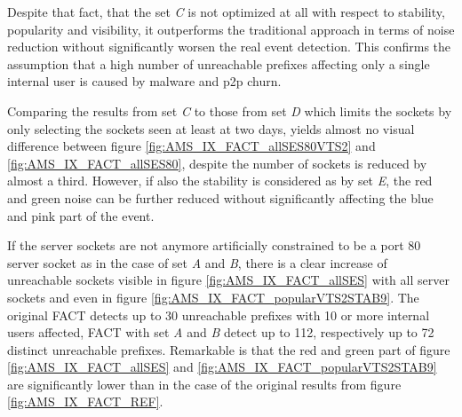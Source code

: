 Despite that fact, that the set \emph{C} is not optimized at all with respect to 
stability, popularity and visibility, it outperforms the traditional approach in 
terms of noise reduction without significantly worsen the real event detection. 
This confirms the assumption that a high number of unreachable prefixes 
affecting only a single internal user is caused by malware and \gls{p2p} churn.

Comparing the results from set \emph{C} to those from set \emph{D} which limits 
the sockets by only selecting the sockets seen at least at two days, yields 
almost no visual difference between figure \ref{fig:AMS_IX_FACT_allSES80VTS2} 
and \ref{fig:AMS_IX_FACT_allSES80}, despite the number of sockets is reduced by 
almost a third. However, if also the stability is considered as by set \emph{E}, 
the red and green noise can be further reduced without significantly affecting 
the blue and pink part of the event.

If the \glspl{server socket} are not anymore artificially constrained to be a 
port 80 \gls{server socket} as in the case of set \emph{A} and \emph{B}, there 
is a clear increase of unreachable sockets visible in figure 
\ref{fig:AMS_IX_FACT_allSES} with all server sockets and even in figure 
\ref{fig:AMS_IX_FACT_popularVTS2STAB9}. 
The original \gls{FACT} detects up to 30 unreachable prefixes with 10 or more 
internal users affected, \gls{FACT} with set \emph{A} and \emph{B} detect up to 
112, respectively up to 72 distinct unreachable prefixes. Remarkable is that the 
red and green part of figure \ref{fig:AMS_IX_FACT_allSES} and 
\ref{fig:AMS_IX_FACT_popularVTS2STAB9} are significantly lower than in the case 
of the original results from figure \ref{fig:AMS_IX_FACT_REF}. 

